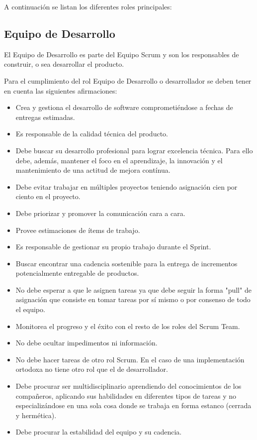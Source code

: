A continuación se listan los diferentes roles principales:

\subsection{Equipo de Desarrollo}

El Equipo de Desarrollo es parte del Equipo Scrum y son los responsables de construir, o sea desarrollar el producto.
 
Para el cumplimiento del rol Equipo de Desarrollo o desarrollador se deben tener en cuenta las siguientes afirmaciones:

\begin{itemize}
\item Crea y gestiona el desarrollo de software comprometiéndose a fechas de entregas estimadas.
\item Es responsable de la calidad técnica del producto.
\item Debe buscar su desarrollo profesional para lograr excelencia técnica. Para ello debe, además, mantener el foco en el aprendizaje, la innovación y el mantenimiento de una actitud de mejora contínua.
\item Debe evitar trabajar en múltiples proyectos teniendo asignación cien por ciento en el proyecto.
\item Debe priorizar y promover la comunicación cara a cara.
\item Provee estimaciones de ítems de trabajo.
\item Es responsable de gestionar su propio trabajo durante el Sprint.
\item Buscar encontrar una cadencia sostenible para la entrega de incrementos potencialmente entregable de productos.
\item No debe esperar a que le asignen tareas ya que debe seguir la forma "pull" de asignación que consiste en tomar tareas por sí mismo o por consenso de todo el equipo.
\item Monitorea el progreso y el éxito con el resto de los roles del Scrum Team.
\item No debe ocultar impedimentos ni información.
\item No debe hacer tareas de otro rol Scrum. En el caso de una implementación ortodoxa no tiene otro rol que el de desarrollador.
\item Debe procurar ser multidisciplinario aprendiendo del conocimientos de los compañeros, aplicando sus habilidades en diferentes tipos de tareas y no especializándose en una sola cosa donde se trabaja en forma estanco (cerrada y hermética).
\item Debe procurar la estabilidad del equipo y su cadencia.
\end{itemize}

